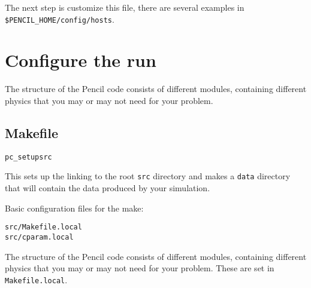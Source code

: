 \documentclass[a4paper,12pt]{article}
\begin{document}
The next step is customize this file, there are several examples in \verb|$PENCIL_HOME/config/hosts|. 



\section{Configure the run}
The structure of the Pencil code consists of different modules, containing
different physics that you may or may not need for your problem. 

\subsection{Makefile}

\begin{verbatim}
pc_setupsrc
\end{verbatim}
This sets up the linking to the root \verb|src| directory and makes a
\verb|data| directory that will contain the data produced by your simulation.

Basic configuration files for the make:
\begin{verbatim}
src/Makefile.local
src/cparam.local
\end{verbatim}

The structure of the Pencil code consists of different modules, containing
different physics that you may or may not need for your problem. These are set
in \verb|Makefile.local|. 
\end{document}
